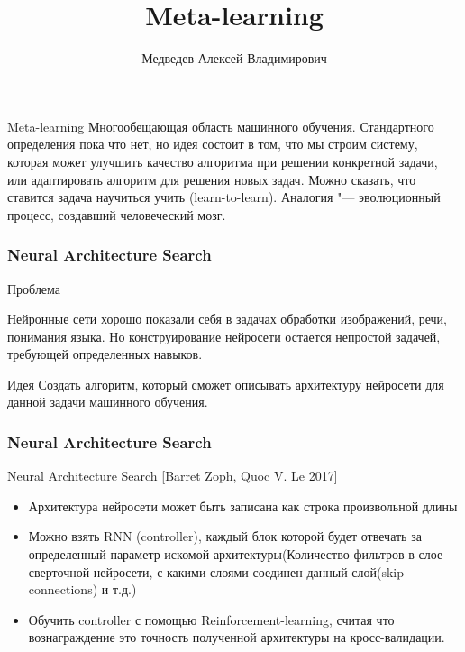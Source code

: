 \documentclass[fleqn, xcolor=x11names]{beamer}
\title{Meta-learning}
\author[Медведев~Д.\,В.]{Медведев Алексей Владимирович}
\institute[ВМК МГУ]{МГУ имени М. В. Ломоносова,
факультет ВМК, кафедра ММП}
\date{}
\begin{document}
\begin{frame}
\maketitle
\end{frame}

\begin{frame}
\begin{block}{Meta-learning}
Многообещающая область машинного обучения. Стандартного определения пока что нет, но идея состоит в том, что мы строим систему, которая может улучшить качество алгоритма при решении конкретной задачи, или адаптировать алгоритм для решения новых задач. Можно сказать, что ставится задача научиться учить (learn-to-learn). Аналогия "--- эволюционный процесс, создавший человеческий мозг.
\end{block}
\end{frame}



\begin{frame}[fragile]\frametitle{Neural Architecture Search}

\begin{block}{Проблема}

Нейронные сети хорошо показали себя в задачах обработки изображений, речи, понимания языка. Но конструирование нейросети остается непростой задачей, требующей определенных навыков.
\end{block}

\begin{block}{Идея}
Создать алгоритм, который сможет описывать архитектуру нейросети для данной задачи машинного обучения.

\end{block}

\end{frame}

\begin{frame}[fragile]\frametitle{Neural Architecture Search}

\begin{block}{Neural Architecture Search [Barret Zoph, Quoc V. Le 2017]}

\begin{itemize}
\item Архитектура нейросети может быть записана как строка произвольной длины

\item Можно взять RNN (controller), каждый блок которой будет отвечать за определенный параметр искомой архитектуры(Количество фильтров в слое сверточной нейросети, с какими слоями соединен данный слой(skip connections) и т.д.)

\item Обучить controller с помощью Reinforcement-learning, считая что вознаграждение это точность полученной архитектуры на кросс-валидации.
\end{itemize}

\end{block}


\end{frame}
\end{document}
